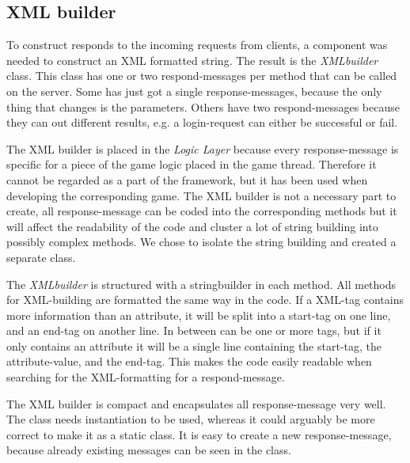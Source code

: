 \subsection{XML builder}
\label{sec:xmlbuilderimpl}
To construct responds to the incoming requests from clients, a component was needed to construct an XML formatted string. The result is the \textit{XMLbuilder} class. This class has one or two respond-messages per method that can be called on the server. Some has just got a single response-messages, because the only thing that changes is the parameters. Others have two respond-messages because they can out different results, e.g. a login-request can either be successful or fail. 

The XML builder is placed in the \textit{Logic Layer} because every response-message is specific for a piece of the game logic placed in the game thread. Therefore it cannot be regarded as a part of the framework, but it has been used when developing the corresponding game. The XML builder is not a necessary part to create, all response-message can be coded into the corresponding methods but it will affect the readability of the code and cluster a lot of string building into possibly complex methods. We chose to isolate the string building and created a separate class.

The \textit{XMLbuilder} is structured with a stringbuilder in each method. All methods for XML-building are formatted the same way in the code. If a XML-tag contains more information than an attribute, it will be split into a start-tag on one line, and an end-tag on another line. In between can be one or more tags, but if it only contains an attribute it will be a single line containing the start-tag, the attribute-value, and the end-tag. This makes the code easily readable when searching for the XML-formatting for a respond-message. 

The XML builder is compact and encapsulates all response-message very well. The class needs instantiation to be used, whereas it could arguably be more correct to make it as a static class. It is easy to create a new response-message, because already existing messages can be seen in the class.
